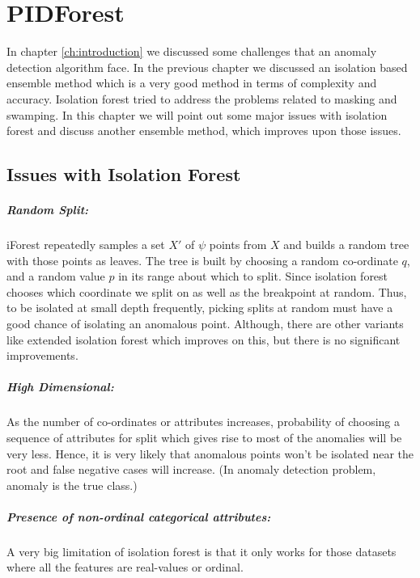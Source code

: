 \chapter{PIDForest}
\label{ch:pidforest}

In chapter \ref{ch:introduction} we discussed some challenges that an anomaly detection algorithm face.
In the previous chapter we discussed an isolation based ensemble method which is a very good method in terms of complexity and accuracy.
Isolation forest tried to address the problems related to masking and swamping.
In this chapter we will point out some major issues with isolation forest and discuss another ensemble method, which improves upon those issues.

\section{Issues with Isolation Forest}
\label{sec:issues-with-iforest}

\paragraph{Random Split:} iForest repeatedly samples a set $X'$ of $\psi$ points from $X$ and builds a random tree with those points as leaves. 
The tree is built by choosing a random co-ordinate $q$, and a random value $p$ in its range about which to split. 
Since isolation forest chooses which coordinate we split on as well as the breakpoint at random.
Thus, to be isolated at small depth frequently, picking splits at random must have a good chance of isolating an anomalous point.
Although, there are other variants like extended isolation forest which improves on this, but there is no significant improvements.

\paragraph{High Dimensional:} As the number of co-ordinates or attributes increases, probability of choosing a sequence of attributes for split which gives rise to most of the anomalies will be very less. 
Hence, it is very likely that anomalous points won't be isolated near the root and false negative cases will increase. (In anomaly detection problem, anomaly is the true class.)

\paragraph{Presence of non-ordinal categorical attributes:} A very big limitation of isolation forest is that it only works for those datasets where all the features are real-values or ordinal.

